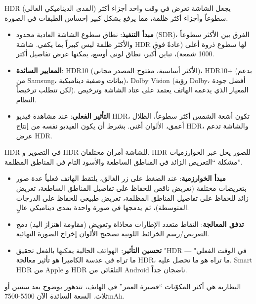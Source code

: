 
HDR (المدى الديناميكي العالي) يجعل الشاشة تعرض في وقت واحد أجزاء أكثر سطوعاً وأجزاء أكثر ظلمة، مما يرفع بشكل كبير إحساس الطبقات في الصورة.

\begin{itemize}
  \item \textbf{مبدأ التنفيذ}: نطاق سطوع الشاشة العادية محدود (SDR)، الفرق بين الأكثر سطوعاً والأكثر ظلمة ليس كبيراً بما يكفي. شاشة HDR لها سطوع ذروة أعلى (عادةً فوق 1000 شمعة)، تباين أكبر، نطاق لوني أوسع، يمكنها عرض تفاصيل أكثر.
  \item \textbf{المعايير السائدة}: HDR10 (الأكثر أساسية، مفتوح المصدر مجاني)، HDR10+ (بدعم من Samsung، بيانات وصفية ديناميكية)، Dolby Vision (رؤية Dolby، أفضل جودة لكن تتطلب ترخيصاً). المعيار الذي يدعمه الهاتف يعتمد على عتاد الشاشة وترخيص النظام.
  \item \textbf{التأثير الفعلي}: عند مشاهدة فيديو HDR، تكون أشعة الشمس أكثر سطوعاً، الظلال أعمق، الألوان أغنى. بشرط أن يكون الفيديو نفسه من إنتاج HDR، والشاشة تدعم عرض HDR.
\end{itemize}


HDR في التصوير و HDR للشاشة أمران مختلفان. HDR للصور يحل عبر الخوارزميات مشكلة “التعريض الزائد في المناطق الساطعة والأسود التام في المناطق المظلمة”.

\begin{itemize}
  \item \textbf{مبدأ الخوارزمية}: عند الضغط على زر الغالق، يلتقط الهاتف فعلياً عدة صور بتعريضات مختلفة (تعريض ناقص للحفاظ على تفاصيل المناطق الساطعة، تعريض زائد للحفاظ على تفاصيل المناطق المظلمة، تعريض طبيعي للحفاظ على الدرجات المتوسطة)، ثم يدمجها في صورة واحدة بمدى ديناميكي عالٍ.
  \item \textbf{تدفق المعالجة}: التقاط متعدد الإطارات محاذاة وتعويض (مقاومة اهتزاز اليد) دمج التعريض/رسم الخرائط اللونية تصحيح الألوان إخراج الصورة النهائية.
  \item \textbf{تحسين التأثير}: الهواتف الحالية يمكنها بالفعل تحقيق "HDR في الوقت الفعلي" — ما تراه في عدسة الكاميرا هو تأثير معالجة HDR، ما تراه هو ما تحصل عليه. Smart HDR من Apple و HDR التلقائي من Android ناضجان جداً.
\end{itemize}


البطارية هي أكثر المكوّنات “قصيرة العمر” في الهاتف، تتدهور بوضوح بعد سنتين أو ثلاث. السعة السائدة الآن 5500-7500mAh.

